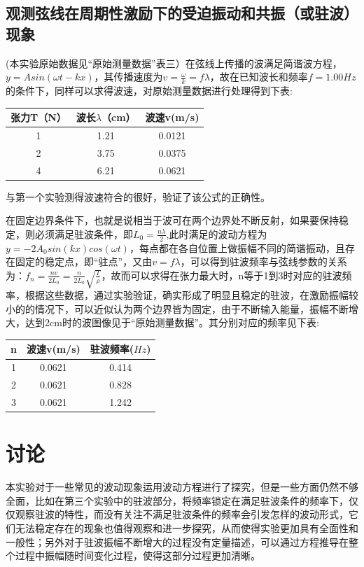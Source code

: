 \documentclass[UTF8]{ctexart}
\begin{document}
\subsection{观测弦线在周期性激励下的受迫振动和共振（或驻波）现象}
(本实验原始数据见“原始测量数据”表三）在弦线上传播的波满足简谐波方程，$y=Asin(\omega t-kx)$，其传播速度为$v=\frac{\omega}{k}=f\lambda$，故在已知波长和频率$f=1.00Hz$的条件下，同样可以求得波速，对原始测量数据进行处理得到下表:
\begin{table}[htbp!] 
\centering 
\begin{tabular}{|c|c|c|} 
\hline 
张力T（N） &  波长$\lambda$（cm）&波速v(m/s)  \\ 
\hline 
1 & 1.21 &0.0121\\ 
\hline
2 & 3.75 &0.0375\\ 
\hline 
4 & 6.21 &0.0621 \\  
\hline
\end{tabular} 
\end{table}

与第一个实验测得波速符合的很好，验证了该公式的正确性。

在固定边界条件下，也就是说相当于波可在两个边界处不断反射，如果要保持稳定，则必须满足驻波条件，即$L_0=\frac{n\lambda}{2}$,此时满足的波动方程为$y=-2A_0sin(kx)cos(\omega t)$，每点都在各自位置上做振幅不同的简谐振动，且存在固定的稳定点，即“驻点”，又由$v=f\lambda$，可以得到驻波频率与弦线参数的关系为：$f_n=\frac{nv}{2L_0}=\frac{n}{2L_0}\sqrt{\frac{T}{\rho}}$，故而可以求得在张力最大时，n等于1到3时对应的驻波频率，根据这些数据，通过实验验证，确实形成了明显且稳定的驻波，在激励振幅较小的的情况下，可以近似认为两个边界皆为固定，由于不断输入能量，振幅不断增大，达到2cm时的波图像见于“原始测量数据”。其分别对应的频率见下表:
\begin{table}[htbp!] 
\centering 
\begin{tabular}{|c|c|c|} 
\hline 
n &  波速v(m/s)&驻波频率($Hz$)  \\ 
\hline 
1 &0.0621 &0.414 \\ 
\hline
2 &0.0621&0.828  \\ 
\hline 
3 &0.0621&1.242 \\  
\hline
\end{tabular} 
\end{table}

\section{讨论}
本实验对于一些常见的波动现象运用波动方程进行了探究，但是一些方面仍然不够全面，比如在第三个实验中的驻波部分，将频率锁定在满足驻波条件的频率下，仅仅观察驻波的特性，而没有关注不满足驻波条件的频率会引发怎样的波动形式，它们无法稳定存在的现象也值得观察和进一步探究，从而使得实验更加具有全面性和一般性；另外对于驻波振幅不断增大的过程没有定量描述，可以通过方程推导在整个过程中振幅随时间变化过程，使得这部分过程更加清晰。
\end{document}
